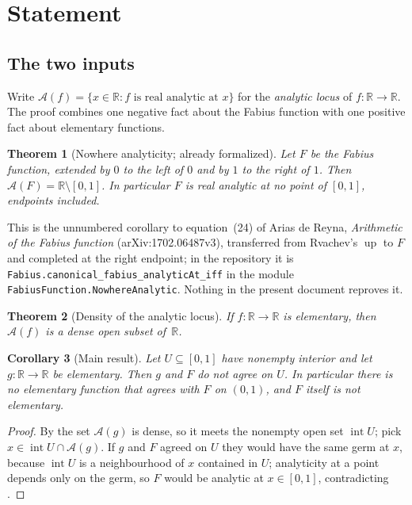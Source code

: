 \documentclass[11pt,oneside]{article}
\newtheorem{theorem}{Theorem}[section]
\newtheorem{corollary}[theorem]{Corollary}
\theoremstyle{definition}
\theoremstyle{remark}
\newcommand{\R}{\mathbb R}
\newcommand{\Up}{\operatorname{up}}
\newcommand{\An}{\mathcal A}
\begin{document}
\tableofcontents

\section{Statement}

\subsection{The two inputs}

Write $\An(f)=\{x\in\R : f \text{ is real analytic at } x\}$ for the
\emph{analytic locus} of $f\colon\R\to\R$.  The proof combines one negative
fact about the Fabius function with one positive fact about elementary
functions.

\begin{theorem}[Nowhere analyticity; already formalized]\label{thm:nowhere}
Let $F$ be the Fabius function, extended by $0$ to the left of $0$ and by $1$
to the right of $1$.  Then $\An(F)=\R\setminus[0,1]$.  In particular $F$ is
real analytic at no point of $[0,1]$, endpoints included.
\end{theorem}

This is the unnumbered corollary to equation~(24) of Arias de Reyna,
\emph{Arithmetic of the Fabius function} (arXiv:1702.06487v3), transferred
from Rvachev's $\Up$ to $F$ and completed at the right endpoint; in the
repository it is \texttt{Fabius.canonical\_fabius\_analyticAt\_iff} in the
module \texttt{FabiusFunction.NowhereAnalytic}.  Nothing in the present
document reproves it.

\begin{theorem}[Density of the analytic locus]\label{thm:density}
If $f\colon\R\to\R$ is elementary, then $\An(f)$ is a dense open subset
of~$\R$.
\end{theorem}

\begin{corollary}[Main result]\label{cor:main}
Let $U\subseteq[0,1]$ have nonempty interior and let $g\colon\R\to\R$ be
elementary.  Then $g$ and $F$ do not agree on $U$.  In particular there is no
elementary function that agrees with $F$ on $(0,1)$, and $F$ itself is not
elementary.
\end{corollary}

\begin{proof}
By  the set $\An(g)$ is dense, so it meets the nonempty open
set $\operatorname{int}U$; pick $x\in\operatorname{int}U\cap\An(g)$.  If $g$
and $F$ agreed on $U$ they would have the same germ at $x$, because
$\operatorname{int}U$ is a neighbourhood of $x$ contained in $U$; analyticity
at a point depends only on the germ, so $F$ would be analytic at $x\in[0,1]$,
contradicting .
\end{proof}
\end{document}
